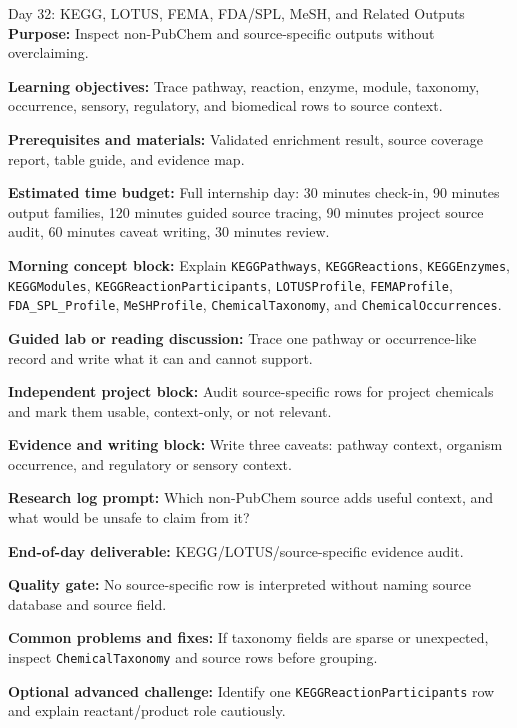 \begin{dailybox}{Day 32: KEGG, LOTUS, FEMA, FDA/SPL, MeSH, and Related Outputs}
\textbf{Purpose:} Inspect non-PubChem and source-specific outputs without overclaiming.

\textbf{Learning objectives:} Trace pathway, reaction, enzyme, module, taxonomy, occurrence, sensory, regulatory, and biomedical rows to source context.

\textbf{Prerequisites and materials:} Validated enrichment result, source coverage report, table guide, and evidence map.

\textbf{Estimated time budget:} Full internship day: 30 minutes check-in, 90 minutes output families, 120 minutes guided source tracing, 90 minutes project source audit, 60 minutes caveat writing, 30 minutes review.

\textbf{Morning concept block:} Explain \texttt{KEGGPathways}, \texttt{KEGGReactions}, \texttt{KEGGEnzymes}, \texttt{KEGGModules}, \texttt{KEGGReactionParticipants}, \texttt{LOTUSProfile}, \texttt{FEMAProfile}, \texttt{FDA\_SPL\_Profile}, \texttt{MeSHProfile}, \texttt{ChemicalTaxonomy}, and \texttt{ChemicalOccurrences}.

\textbf{Guided lab or reading discussion:} Trace one pathway or occurrence-like record and write what it can and cannot support.

\textbf{Independent project block:} Audit source-specific rows for project chemicals and mark them usable, context-only, or not relevant.

\textbf{Evidence and writing block:} Write three caveats: pathway context, organism occurrence, and regulatory or sensory context.

\textbf{Research log prompt:} Which non-PubChem source adds useful context, and what would be unsafe to claim from it?

\textbf{End-of-day deliverable:} KEGG/LOTUS/source-specific evidence audit.

\textbf{Quality gate:} No source-specific row is interpreted without naming source database and source field.

\textbf{Common problems and fixes:} If taxonomy fields are sparse or unexpected, inspect \texttt{ChemicalTaxonomy} and source rows before grouping.

\textbf{Optional advanced challenge:} Identify one \texttt{KEGGReactionParticipants} row and explain reactant/product role cautiously.
\end{dailybox}


